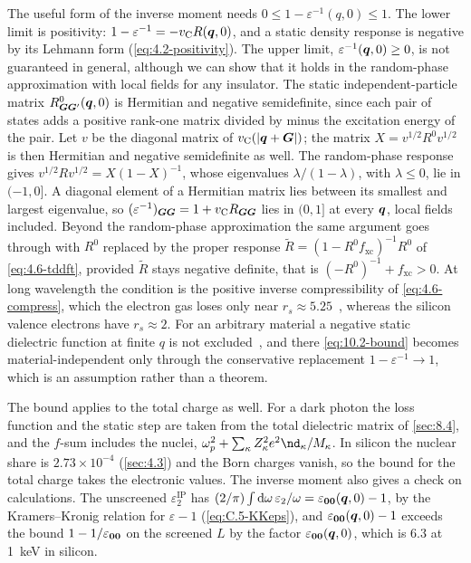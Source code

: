 The useful form of the inverse moment needs $0 \le 1 - \varepsilon^{-1}(q,0) \le 1$. The lower limit is positivity: $1 - \varepsilon^{-1} = -v_{\mathrm{C}}R(\bm{q},0)$, and a static density response is negative by its Lehmann form (\cref{eq:4.2-positivity}). The upper limit, $\varepsilon^{-1}(\bm{q},0) \ge 0$, is not guaranteed in general, although we can show that it holds in the random-phase approximation with local fields for any insulator. The static independent-particle matrix $R^0_{\bm{G}\bm{G}'}(\bm{q},0)$ is Hermitian and negative semidefinite, since each pair of states adds a positive rank-one matrix divided by minus the excitation energy of the pair. Let $v$ be the diagonal matrix of $v_{\mathrm{C}}(|\bm{q}+\bm{G}|)$; the matrix $X = v^{1/2}R^0v^{1/2}$ is then Hermitian and negative semidefinite as well. The random-phase response gives $v^{1/2}Rv^{1/2} = X(1 - X)^{-1}$, whose eigenvalues $\lambda/(1 - \lambda)$, with $\lambda \le 0$, lie in $(-1, 0]$. A diagonal element of a Hermitian matrix lies between its smallest and largest eigenvalue, so $(\varepsilon^{-1})_{\bm{G}\bm{G}} = 1 + v_{\mathrm{C}}R_{\bm{G}\bm{G}}$ lies in $(0, 1]$ at every $\bm{q}$, local fields included. Beyond the random-phase approximation the same argument goes through with $R^0$ replaced by the proper response $\tilde R = (1 - R^0f_{\mathrm{xc}})^{-1}R^0$ of \cref{eq:4.6-tddft}, provided $\tilde R$ stays negative definite, that is $(-R^0)^{-1} + f_{\mathrm{xc}} > 0$. At long wavelength the condition is the positive inverse compressibility of \cref{eq:4.6-compress}, which the electron gas loses only near $r_s \approx 5.25$~\cite{giuliani2005quantum}, whereas the silicon valence electrons have $r_s \approx 2$. For an arbitrary material a negative static dielectric function at finite $q$ is not excluded~\cite{dolgov1981admissible}, and there \cref{eq:10.2-bound} becomes material-independent only through the conservative replacement $1 - \varepsilon^{-1} \to 1$, which is an assumption rather than a theorem.

The bound applies to the total charge as well. For a dark photon the loss function and the static step are taken from the total dielectric matrix of \cref{sec:8.4}, and the $f$-sum includes the nuclei, $\omega_p^2 + \sum_\kappa Z_\kappa^2e^2\nd_\kappa/M_\kappa$. In silicon the nuclear share is $2.73\times10^{-4}$ (\cref{sec:4.3}) and the Born charges vanish, so the bound for the total charge takes the electronic values. The inverse moment also gives a check on calculations. The unscreened $\varepsilon_2^{\mathrm{IP}}$ has $(2/\pi)\int\mathrm{d}\omega\,\varepsilon_2/\omega = \varepsilon_{\bm{0}\bm{0}}(\bm{q},0) - 1$, by the Kramers--Kronig relation for $\varepsilon - 1$ (\cref{eq:C.5-KKeps}), and $\varepsilon_{\bm{0}\bm{0}}(\bm{q},0) - 1$ exceeds the bound $1 - 1/\varepsilon_{\bm{0}\bm{0}}$ on the screened $L$ by the factor $\varepsilon_{\bm{0}\bm{0}}(\bm{q},0)$, which is 6.3 at \SI{1}{keV} in silicon.

